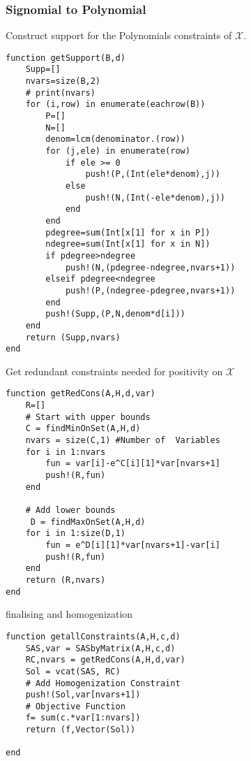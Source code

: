 \documentclass[./main.tex]{subfiles}
\begin{document}
\subsubsection{Signomial to Polynomial}

Construct support for the Polynomials constraints of $\mathcal{X}$.
\begin{lstlisting}
function getSupport(B,d)
    Supp=[]
    nvars=size(B,2)
    # print(nvars)
    for (i,row) in enumerate(eachrow(B))
        P=[]
        N=[]
        denom=lcm(denominator.(row))
        for (j,ele) in enumerate(row)
            if ele >= 0
                push!(P,(Int(ele*denom),j))
            else
                push!(N,(Int(-ele*denom),j))
            end
        end
        pdegree=sum(Int[x[1] for x in P])
        ndegree=sum(Int[x[1] for x in N])
        if pdegree>ndegree
            push!(N,(pdegree-ndegree,nvars+1))
        elseif pdegree<ndegree
            push!(P,(ndegree-pdegree,nvars+1))   
        end
        push!(Supp,(P,N,denom*d[i]))
    end
    return (Supp,nvars)
end
\end{lstlisting}


Get redundant constraints needed for positivity on $\mathcal{X}$
\begin{lstlisting}
function getRedCons(A,H,d,var)
    R=[]
    # Start with upper bounds
    C = findMinOnSet(A,H,d)
    nvars = size(C,1) #Number of  Variables
    for i in 1:nvars
        fun = var[i]-e^C[i][1]*var[nvars+1]
        push!(R,fun)
    end
    
    # Add lower bounds
     D = findMaxOnSet(A,H,d)
    for i in 1:size(D,1)
        fun = e^D[i][1]*var[nvars+1]-var[i]
        push!(R,fun)
    end
    return (R,nvars)
end
\end{lstlisting}

finalising and homogenization
\begin{lstlisting}
function getallConstraints(A,H,c,d)
    SAS,var = SASbyMatrix(A,H,c,d)
    RC,nvars = getRedCons(A,H,d,var)
    Sol = vcat(SAS, RC)
    # Add Homogenization Constraint
    push!(Sol,var[nvars+1])
    # Objective Function
    f= sum(c.*var[1:nvars])
    return (f,Vector(Sol))
    
end
\end{lstlisting}
\end{document}
